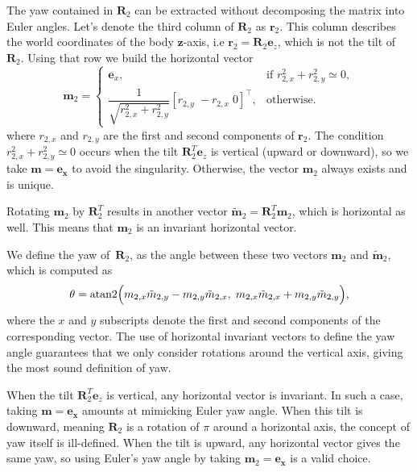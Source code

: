 \documentclass{IJCAS}
\begin{document}
The yaw contained in $\boldsymbol{R}_{2}$ can be extracted without decomposing the
matrix into Euler angles.  Let's denote the third column of $\boldsymbol{R}_{2}$ as $\boldsymbol{r}_{2}$.
This column describes the world coordinates of the body $\boldsymbol{z}$-axis, i.e $\boldsymbol{r}_{2}=\boldsymbol{R}_{2}\boldsymbol{e}_z$, which is not the tilt of $\boldsymbol{R}_{2}$. 
Using that row we build the horizontal vector
\begin{equation}
  \boldsymbol{m}_2
  =
  \begin{cases}
    \boldsymbol{e}_x, &
    \text{if } {r}_{2,x}^{2}+{r}_{2,y}^{2}\simeq0,\\[6pt]
      \dfrac{1}{\sqrt{{r}_{2,x}^{2}+{r}_{2,y}^{2}}} [{r}_{2,y}\;-{r}_{2,x}\;0]^{\top},
    & \text{otherwise.}
  \end{cases}
\end{equation}
where ${r}_{2,x}$ and ${r}_{2,y}$ are the first and second components of $\boldsymbol{r}_{2}$. 
The condition ${r}_{2,x}^{2}+{r}_{2,y}^{2}\simeq0$ occurs when the tilt $\boldsymbol{R}_{2}^T \boldsymbol{e}_z$ is vertical (upward or downward), so we take $\boldsymbol{m}=\boldsymbol{e_x}$ to avoid the singularity.
Otherwise, the vector $\boldsymbol{m}_2$ always exists and is unique.

Rotating $\boldsymbol{m}_2$ by $\boldsymbol{R}_{2}^T$
results in another vector
$\tilde{\boldsymbol{m}}_2=\boldsymbol{R}_{2}^T\boldsymbol{m}_2$, which is horizontal as well.
This means that  $\boldsymbol{m}_2$ is an invariant horizontal vector. 

We define the yaw of~$\boldsymbol{R}_{2}$, as the angle between these two vectors $\boldsymbol{m}_2$ and $\tilde{\boldsymbol{m}}_2$, which is computed as
\begin{equation}
  \theta
  =
  \operatorname{atan2}\Bigl(
     {m}_{2,x}\tilde{{m}}_{2,y}
    -{m}_{2,y}\tilde{{m}}_{2,x},\;
     {m}_{2,x}\tilde{{m}}_{2,x}
    +{m}_{2,y}\tilde{{m}}_{2,y}
  \Bigr),
  \label{eq:yaw_theta}
\end{equation}
where the $x$ and $y$ subscripts denote the first and second components of the corresponding vector. 
The use of horizontal invariant vectors to define the yaw angle guarantees that we only consider rotations around the vertical axis, giving the most sound definition of yaw.

When the tilt $\boldsymbol{R}_{2}^T \boldsymbol{e}_z$ is vertical, any horizontal vector is invariant. In such a case, taking $\boldsymbol{m}=\boldsymbol{e_x}$ amounts at mimicking Euler yaw angle. 
When this tilt is downward, meaning $\boldsymbol{R}_{2}$ is a rotation of $\pi$ around a horizontal axis, the concept of yaw itself is ill-defined. When the tilt is upward, any horizontal vector gives the same yaw, so using Euler's yaw angle by taking  $\boldsymbol{m}_2=\boldsymbol{e_x}$ is a valid choice.
\end{document}
